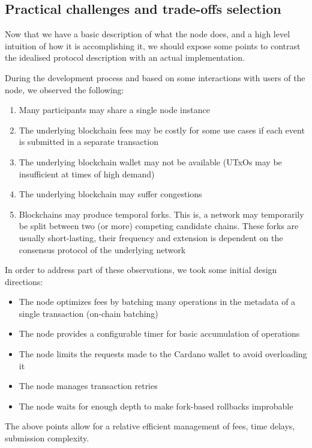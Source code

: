 \documentclass[10pt,a4paper]{article}
\begin{document}
\subsection{Practical challenges and trade-offs selection}

Now that we have a basic description of what the node does, and a high level intuition of how it is accomplishing it, we should expose some points to contrast the idealised protocol description with an actual implementation. 

During the development process and based on some interactions with users of the node, we observed the following:
\begin{enumerate}
  \item Many participants may share a single node instance
  \item The underlying blockchain fees may be costly for some use cases if each event is submitted in a separate transaction
  \item The underlying blockchain wallet may not be available (UTxOs may be insufficient at times of high demand)
  \item The underlying blockchain may suffer congestions
  \item Blockchains may produce temporal forks. This is, a network may temporarily be split between two (or more) competing candidate chains. These 
	forks are usually short-lasting, their frequency and extension is dependent on the consensus protocol of the underlying network
\end{enumerate}

In order to address part of these observations, we took some initial design directions:
\begin{itemize}
  \item The node optimizes fees by batching many operations in the metadata of a single transaction (on-chain batching)
  \item The node provides a configurable timer for basic accumulation of operations
  \item The node limits the requests made to the Cardano wallet to avoid overloading it
  \item The node manages transaction retries
  \item The node waits for enough depth to make fork-based rollbacks improbable
\end{itemize}

The above points allow for a relative efficient management of fees, time delays, submission complexity.
\end{document}
